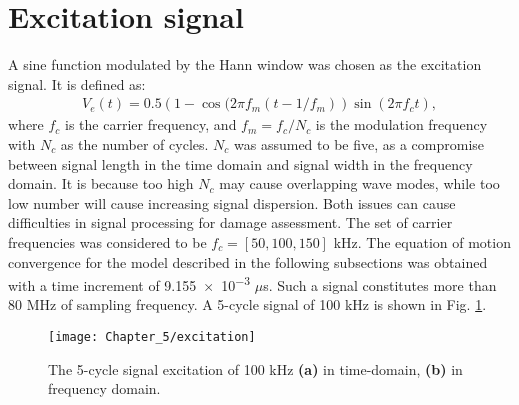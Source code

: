 \section{Excitation signal}
\label{sec:excitation}

A sine function modulated by the Hann window was chosen as the excitation signal.
It is defined as:
\begin{eqnarray}
	V_e(t) = 0.5\left(1-\cos(2\pi f_m(t-1/f_m)\right)\sin(2\pi f_ct),
\end{eqnarray}
%
%
%
where \(f_c\) is the carrier frequency, and \(f_m=f_c/N_c\) is the modulation frequency with \(N_c\) as the number of cycles.
\(N_c\) was assumed to be five, as a compromise between signal length in the time domain and signal width in the frequency domain.
It is because too high \(N_c\) may cause overlapping wave modes, while too low number will cause increasing signal dispersion.
Both issues can cause difficulties in signal processing for damage assessment.
The set of carrier frequencies was considered to be \(f_c=[50, 100, 150] \) \unit{\kHz}.
The equation of motion convergence for the model described in the following subsections was obtained with a time increment of \num{9.155e-3} \(\mu\)s.
Such a signal constitutes more than 80 \unit{\MHz} of sampling frequency.
A 5-cycle signal of 100 \unit{\kHz} is shown in Fig. \ref{fig:signal_100kHz}.
\begin{figure}[H]
	\begin{center}
		\texttt{[image: Chapter\_5/excitation]}
	\end{center}
	\caption{The 5-cycle signal excitation of 100 kHz \textbf{(a)} in time-domain, \textbf{(b)} in frequency domain.}
	\label{fig:signal_100kHz}
\end{figure}
